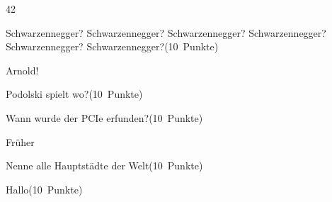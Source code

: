 \documentclass[addpoints,a4paper,ngerman,10pt,answers]{exam}
\begin{document}
\begin{questions}
\ifprintanswers
\begin{minipage}{0.7\textwidth}
\begin{solution}
\parbox[t][][t]{0.8\textwidth}{42}
\end{solution}
\end{minipage}
\else
{}
\fi
\vspace{1cm}
\question[10] \parbox[t][][t]{0.65\textwidth}{Schwarzennegger? Schwarzennegger? Schwarzennegger? Schwarzennegger? Schwarzennegger? Schwarzennegger?\linebreak(10\ Punkte)}

\ifprintanswers
\begin{minipage}{0.7\textwidth}
\begin{solution}
\parbox[t][][t]{0.8\textwidth}{Arnold!}
\end{solution}
\end{minipage}
\else
{}
\fi
\vspace{1cm}
\question[10] \parbox[t][][t]{0.65\textwidth}{Podolski spielt wo?\linebreak(10\ Punkte)}

\ifprintanswers
\begin{minipage}{0.7\textwidth}
\begin{solution}
\parbox[t][][t]{0.8\textwidth}{}
\end{solution}
\end{minipage}
\else
{}
\fi
\vspace{1cm}
\question[10] \parbox[t][][t]{0.65\textwidth}{Wann wurde der PCIe erfunden?\linebreak(10\ Punkte)}

\ifprintanswers
\begin{minipage}{0.7\textwidth}
\begin{solution}
\parbox[t][][t]{0.8\textwidth}{Früher}
\end{solution}
\end{minipage}
\else
{}
\fi
\vspace{1cm}
\question[10] \parbox[t][][t]{0.65\textwidth}{Nenne alle Hauptstädte der Welt\linebreak(10\ Punkte)}

\ifprintanswers
\begin{minipage}{0.7\textwidth}
\begin{solution}
\parbox[t][][t]{0.8\textwidth}{}
\end{solution}
\end{minipage}
\else
{}
\fi
\vspace{1cm}
\question[10] \parbox[t][][t]{0.65\textwidth}{Hallo\linebreak(10\ Punkte)}


\end{questions}
\end{document}
